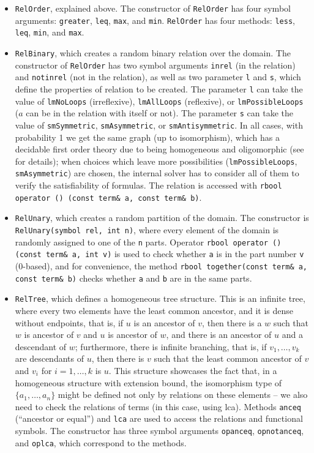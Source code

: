 \begin{itemize}
\item {\tt RelOrder}, explained above. 
The constructor of {\tt RelOrder} has
four symbol arguments: {\tt greater}, {\tt leq}, {\tt max}, and {\tt min}.
{\tt RelOrder} has four methods: {\tt less}, {\tt leq}, {\tt min}, and {\tt max}.

\item {\tt RelBinary}, which creates a random binary relation over the domain.
The constructor of {\tt RelOrder} has two symbol arguments {\tt inrel} (in the relation)
and {\tt notinrel} (not in the relation), as well as two parameter {\tt l} and {\tt s},
which define the properties of relation to be created. The parameter {\tt l} can take
the value of {\tt lmNoLoops} (irreflexive), {\tt lmAllLoops} (reflexive), or 
{\tt lmPossibleLoops} ($a$ can be in the relation with itself or not). The parameter
{\tt s} can take the value of {\tt smSymmetric}, {\tt smAsymmetric}, or {\tt smAntisymmetric}.
In all cases, with probability 1 we get the same graph
(up to isomorphism), which has a decidable first order theory due to being
homogeneous and oligomorphic (see \cite{lois-sat} for details); when choices
which leave more possibilities ({\tt lmPossibleLoops}, {\tt smAsymmetric})
are chosen, the internal solver has to consider all of them to verify the satisfiability
of formulas.
The relation is accessed with {\tt rbool operator () (const term\& a, const term\& b)}.

\item {\tt RelUnary}, which creates a random partition of the domain. The constructor is
{\tt RelUnary(symbol rel, int n)}, where every element of the domain is randomly
assigned to one of the {\tt n} parts. Operator {\tt rbool operator () (const term\& a, int v)}
is used to check whether {\tt a} is in the part number {\tt v} (0-based), and
for convenience, the method
{\tt rbool together(const term\& a, const term\& b)} checks whether {\tt a} and {\tt b}
are in the same parts.

\item {\tt RelTree}, which defines a homogeneous tree structure.
This is an infinite tree, where every two elements have the least common ancestor,
and it is dense without endpoints, that is, if $u$ is an ancestor of $v$, then
there is a $w$ such that $w$ is ancestor of $v$ and $u$ is ancestor of $w$, and
there is an ancestor of $u$ and a descendant of $w$; furthermore, there is infinite
branching, that is, if $v_1, \ldots, v_k$
are descendants of $u$, then there is $v$ such that the least common ancestor
of $v$ and $v_i$ for $i=1, \ldots, k$ is $u$. This structure showcases the fact
that, in a homogeneous structure with extension bound, the isomorphism type of
$\{a_1, \ldots, a_n\}$ might be defined not only by relations
on these elements -- we also need to check the relations of terms (in this case,
using lca).
Methods {\tt anceq} (``ancestor or equal'') and {\tt lca} are used to
access the relations and functional symbols. The constructor has three symbol arguments
{\tt opanceq}, {\tt opnotanceq}, and {\tt oplca}, which correspond to the methods.


\end{itemize}
